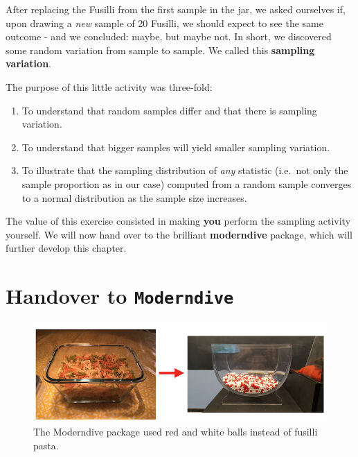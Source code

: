 \documentclass[]{book}
\providecommand{\tightlist}{%
  \setlength{\itemsep}{0pt}\setlength{\parskip}{0pt}}
\newenvironment{note}{\begin{tcolorbox}[colback=blue!5!white,colframe=blue!75!black]}{\end{tcolorbox}}
\begin{document}
After replacing the Fusilli from the first sample in the jar, we asked
ourselves if, upon drawing a \emph{new} sample of 20 Fusilli, we should
expect to see the same outcome - and we concluded: maybe, but maybe not.
In short, we discovered some random variation from sample to sample. We
called this \textbf{sampling variation}.

The purpose of this little activity was three-fold:

\begin{enumerate}
\def\labelenumi{\arabic{enumi}.}
\tightlist
\item
  To understand that random samples differ and that there is sampling
  variation.
\item
  To understand that bigger samples will yield smaller sampling
  variation.
\item
  To illustrate that the sampling distribution of \emph{any} statistic
  (i.e.~not only the sample proportion as in our case) computed from a
  random sample converges to a normal distribution as the sample size
  increases.
\end{enumerate}

\begin{note}
The value of this exercise consisted in making \textbf{you} perform the
sampling activity yourself. We will now hand over to the brilliant
\textbf{moderndive} package, which will further develop this chapter.
\end{note}

\section{\texorpdfstring{Handover to
\texttt{Moderndive}}{Handover to Moderndive}}\label{handover-to-moderndive}

\begin{figure}

{\centering \includegraphics[width=0.9\linewidth]{images/transition} 

}

\caption{The Moderndive package used red and white balls instead of fusilli pasta.}\label{fig:handover}
\end{figure}
\end{document}
